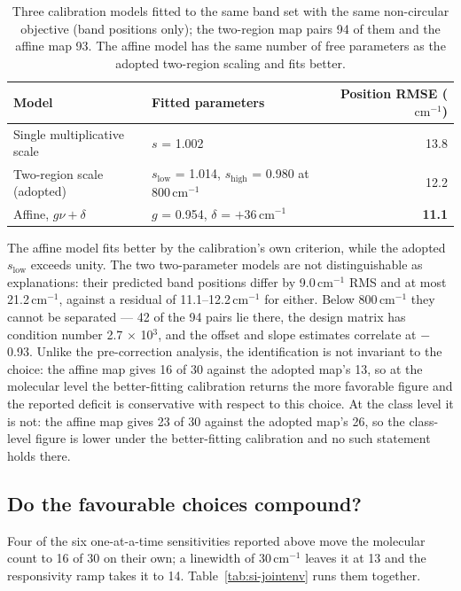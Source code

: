 \documentclass[11pt]{article}
\newcommand*\wn{\ensuremath{\text{cm}^{-1}}}
\begin{document}
\begin{table}[htbp]
\centering
\caption{Three calibration models fitted to the same band set with the same non-circular objective (band positions only); the two-region map pairs 94 of them and the affine map 93. The affine model has the same number of
free parameters as the adopted two-region scaling and fits better.}
\label{tab:si-affine}
\small
\begin{tabular}{llr}
\toprule
Model & Fitted parameters & Position RMSE (\wn) \\
\midrule
Single multiplicative scale & $s$ = 1.002 & 13.8 \\
Two-region scale (adopted) & $s_\mathrm{low}$ = 1.014, $s_\mathrm{high}$ = 0.980 at 800\,\wn{} & 12.2 \\
Affine, $g\nu + \delta$ & $g$ = 0.954, $\delta$ = $+$36\,\wn{} & \textbf{11.1} \\
\bottomrule
\end{tabular}

\begin{flushleft}\footnotesize The affine model fits better by the calibration's own
criterion, while the adopted $s_\mathrm{low}$ exceeds unity. The two two-parameter models
are not distinguishable as explanations: their predicted band positions differ by
9.0\,\wn{} RMS and at most 21.2\,\wn{}, against a residual of 11.1--12.2\,\wn{} for either.
Below 800\,\wn{} they cannot be separated --- 42 of the 94 pairs lie there, the design
matrix has condition number 2.7 $\times$ 10$^{3}$, and the offset and slope estimates
correlate at $-$0.93. Unlike the pre-correction analysis, the identification is not
invariant to the choice: the affine map gives 16 of 30 against the adopted map's 13, so at the molecular level the better-fitting calibration returns the more favorable figure and the reported deficit is conservative with respect to this choice. At the class level it is not: the affine map gives 23 of 30 against the adopted map's 26, so the class-level figure is lower under the better-fitting calibration and no such statement holds there.\end{flushleft}
\end{table}

\subsection{Do the favourable choices compound?}

Four of the six one-at-a-time sensitivities reported above move the molecular count to 16
of 30 on their own; a linewidth of 30\,\wn{} leaves it at 13 and the responsivity ramp
takes it to 14. Table~\ref{tab:si-jointenv} runs them together.
\end{document}
